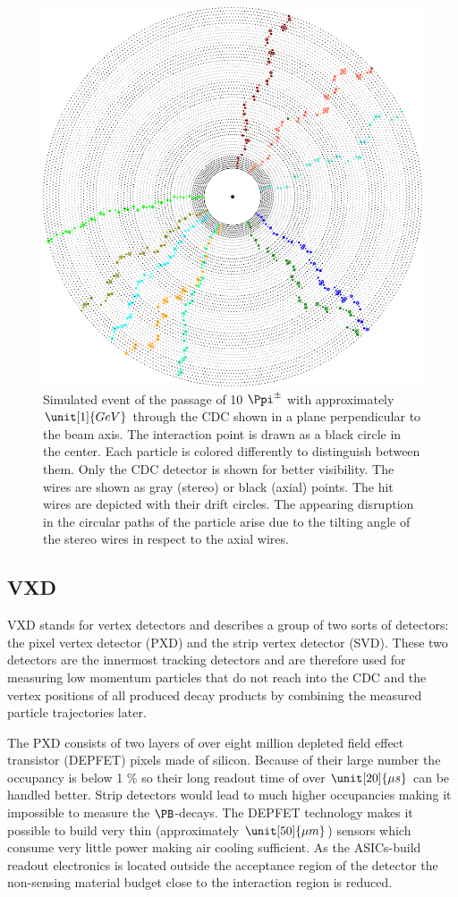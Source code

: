 \begin{figure}
  \centering
  \includegraphics[width=0.8\linewidth]{figures/experimental_setup/eventDisplayPionGun.png}
  \caption[Simulated event of the passage of 10 $\Ppi^\pm$ through the CDC.]{Simulated event of the passage of 10 $\Ppi^\pm$ with approximately $\unit[1]{GeV}$ through the CDC shown in a plane perpendicular to the beam axis. The interaction point is drawn as a black circle in the center. Each particle is colored differently to distinguish between them. Only the CDC detector is shown for better visibility. The wires are shown as gray (stereo) or black (axial) points. The hit wires are depicted with their drift circles. The appearing disruption in the circular paths of the particle arise due to the tilting angle of the stereo wires in respect to the axial wires.}
  \label{fig-event-display}
\end{figure}

\subsection{VXD}
VXD stands for vertex detectors and describes a group of two sorts of detectors: the pixel vertex detector (PXD) and the strip vertex detector (SVD). These two detectors are the innermost tracking detectors and are therefore used for measuring low momentum particles that do not reach into the CDC and the vertex positions of all produced decay products by combining the measured particle trajectories later.

The PXD consists of two layers of over eight million depleted field effect transistor (DEPFET) pixels made of silicon. Because of their large number the occupancy is below 1 \% so their long readout time of over $\unit[20]{\mu s}$ can be handled better. Strip detectors would lead to much higher occupancies making it impossible to measure the $\PB$-decays. 
The DEPFET technology makes it possible to build very thin (approximately $\unit[50]{\mu m}$) sensors which consume very little power making air cooling sufficient. As the ASICs-build readout electronics is located outside the acceptance region of the detector the non-sensing material budget close to the interaction region is reduced.

